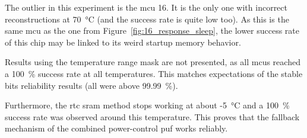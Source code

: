 The outlier in this experiment is the \gls{mcu} 16. It is the only one with incorrect reconstructions at 70~°C (and the success rate is quite low too). As this is the same \gls{mcu} as the one from Figure~\ref{fig:16_response_sleep}, the lower success rate of this chip may be linked to its weird startup memory behavior.

Results using the temperature range mask are not presented, as all \glspl{mcu} reached a 100~\% success rate at all temperatures. This matches expectations of the stable bits reliability results (all were above 99.99~\%).

Furthermore, the \gls{rtc} \gls{sram} method stops working at about -5~°C and a 100~\% success rate was observed around this temperature. This proves that the fallback mechanism of the combined power-control \gls{puf} works reliably.


